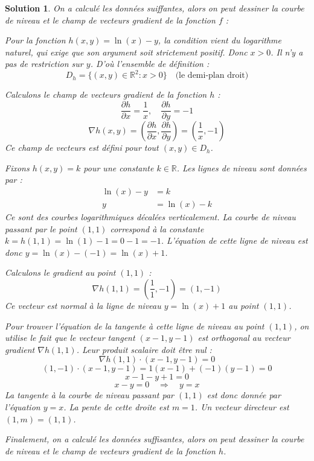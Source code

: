 \documentclass[10pt]{article}
\theoremstyle{frenchstyle}
\newtheorem{solution}{Solution}
\begin{document}
\begin{solution}
	On a calculé les données suiffantes, alors on peut dessiner la courbe de niveau et le champ de vecteurs gradient de la fonction $f$ :

	\begin{figure}[H]
		\centering
		
		\label{fig:transport}
	\end{figure}

	Pour la fonction $h(x,y) = \ln(x) - y$, la condition vient du logarithme naturel, qui exige que son argument soit strictement positif. Donc $x>0$. Il n'y a pas de restriction sur $y$. D'où l'ensemble de définition :
	\[
		D_h = \{(x, y) \in \mathbb{R}^2 : x > 0\} \quad \text{(le demi-plan droit)}
	\]

	Calculons le champ de vecteurs gradient de la fonction $h$ :
	\[
		\frac{\partial h}{\partial x} = \frac{1}{x}, \quad \frac{\partial h}{\partial y} = -1
	\]
	\[
		\nabla h(x,y) = \left( \frac{\partial h}{\partial x}, \frac{\partial h}{\partial y} \right) = \left( \frac{1}{x}, -1 \right)
	\]
	Ce champ de vecteurs est défini pour tout $(x, y) \in D_h$.

	Fixons $h(x,y) = k$ pour une constante $k \in \mathbb{R}$. Les lignes de niveau sont données par :
	\begin{align*}
		\ln(x) - y & = k          \\
		y          & = \ln(x) - k
	\end{align*}
	Ce sont des courbes logarithmiques décalées verticalement. La courbe de niveau passant par le point $(1, 1)$ correspond à la constante $k = h(1,1) = \ln(1) - 1 = 0 - 1 = -1$. L'équation de cette ligne de niveau est donc $y = \ln(x) - (-1) = \ln(x) + 1$.

	Calculons le gradient au point $(1,1)$ :
	\[
		\nabla h(1,1) = \left( \frac{1}{1}, -1 \right) = (1,-1)
	\]
	Ce vecteur est normal à la ligne de niveau $y = \ln(x) + 1$ au point $(1,1)$.

	Pour trouver l'équation de la tangente à cette ligne de niveau au point $(1, 1)$, on utilise le fait que le vecteur tangent $(x-1, y-1)$ est orthogonal au vecteur gradient $\nabla h(1,1)$. Leur produit scalaire doit être nul :
	\[
		\nabla h(1,1) \cdot (x-1, y-1) = 0
	\]
	\[
		(1, -1) \cdot (x-1, y-1) = 1(x-1) + (-1)(y-1) = 0
	\]
	\[
		x - 1 - y + 1 = 0
	\]
	\[
		x - y = 0 \quad \Rightarrow \quad y = x
	\]
	La tangente à la courbe de niveau passant par $(1, 1)$ est donc donnée par l'équation $y = x$. La pente de cette droite est $m=1$. Un vecteur directeur est $(1, m) = (1, 1)$.

	Finalement, on a calculé les données suffisantes, alors on peut dessiner la courbe de niveau et le champ de vecteurs gradient de la fonction $h$.
	\begin{figure}[H]
		\centering
		
		\label{fig:transport}
	\end{figure}
\end{solution}
\end{document}
